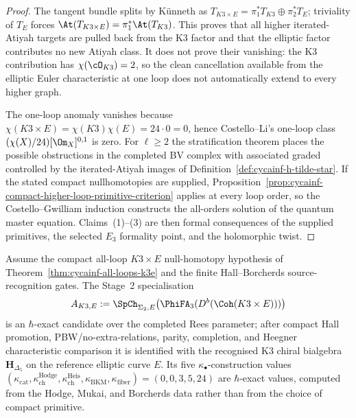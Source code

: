 \begin{proof}
The tangent bundle splits by K\"unneth as $T_{K3 \times E} =
\pi_1^* T_{K3} \oplus \pi_2^* T_E$; triviality of $T_E$ forces
$\At(T_{K3 \times E}) = \pi_1^* \At(T_{K3})$. This proves that all
higher iterated-Atiyah targets are pulled back from the K3 factor and
that the elliptic factor contributes no new Atiyah class. It does not
prove their vanishing: the K3 contribution has
$\chi(\cO_{K3}) = 2$, so the clean cancellation available from the
elliptic Euler characteristic at one loop does not automatically
extend to every higher graph.

The one-loop anomaly vanishes because
$\chi(K3 \times E) = \chi(K3)\chi(E) = 24 \cdot 0 = 0$, hence
Costello--Li's one-loop class
$(\chi(X)/24)[\Om_X]^{0,1}$ is zero. For $\ell \geq 2$ the
stratification theorem places the possible obstructions in the completed
BV complex with associated graded controlled by the iterated-Atiyah
images of Definition~\ref{def:cycainf-h-tilde-star}. If the stated
compact nullhomotopies are supplied, Proposition~\ref{prop:cycainf-compact-higher-loop-primitive-criterion}
applies at every loop order, so the Costello--Gwilliam induction
constructs the all-orders solution of the quantum master equation.
Claims~(1)--(3) are then formal consequences of the supplied primitives,
the selected $E_3$ formality point, and the holomorphic twist.
\end{proof}

\begin{corollary}
\label{cor:cycainf-h-delta5-exact}
Assume the compact all-loop $K3 \times E$ null-homotopy hypothesis of
Theorem~\ref{thm:cycainf-all-loops-k3e} and the finite Hall--Borcherds
source-recognition gates. The Stage~2 specialisation
\[
A_{K3,E}:=\SpCh_{\Sigma_2, E}\bigl(\PhiFA_3(D^b(\Coh(K3\times E)))\bigr)
\]
is an $\hbar$-exact candidate over the completed Rees parameter; after
compact Hall promotion, PBW/no-extra-relations, parity, completion, and
Heegner characteristic comparison it is identified with the recognised
K3 chiral bialgebra $\mathbf H_{\Delta_5}$ on the reference elliptic
curve $E$. Its five
$\kappa_\bullet$-construction values $(\kappa_{\mathrm{cat}},
\kappa_{\mathrm{ch}}^{\mathrm{Hodge}},
\kappa_{\mathrm{ch}}^{\mathrm{Heis}}, \kappa_{\mathrm{BKM}},
\kappa_{\mathrm{fiber}}) = (0, 0, 3, 5, 24)$ are $\hbar$-exact values,
computed from the Hodge, Mukai, and Borcherds data rather than from the
choice of compact primitive.
\end{corollary}

